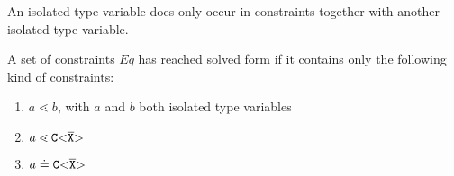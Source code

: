 \begin{definition} \label{def:isolated-type-variable}
  \rm
An isolated type variable does only occur in constraints together with another isolated type variable.
\end{definition}

\begin{definition}\label{def:solved-form}
  \rm
  A set of constraints $Eq$ has reached solved form if it contains only the following kind of constraints:
  \begin{enumerate}
    \item $a \lessdot b$, with $a$ and $b$ both isolated type variables
    \item $a \lessdot \mathtt{C {\tt <} \overline{\tt X} {\tt >} }$
    \item $a \doteq \mathtt{C {\tt <} \overline{\tt X} {\tt >} }$
  \end{enumerate}
\end{definition}

